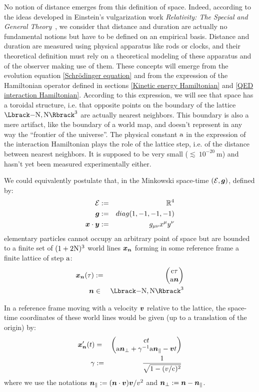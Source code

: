 \documentclass[10pt,a4paper,twoside,openany]{book}
\begin{document}
 No notion of distance emerges from this definition of space. Indeed, according to the ideas developed in Einstein's vulgarization work \textit{Relativity: The Special and General Theory}~\cite{Einstein1916}, we consider that distance and duration are actually no fundamental notions but have to be defined on an empirical basis. Distance and duration are measured using physical apparatus like rods or clocks, and their theoretical definition must rely on a theoretical modeling of these apparatus and of the observer making use of them. These concepts will emerge from the evolution equation \ref{Schrödinger equation} and from the expression of the Hamiltonian operator defined in sections \ref{Kinetic energy Hamiltonian} and \ref{QED interaction Hamiltonian}. According to this expression, we will see that space has a toroidal structure, i.e. that opposite points on the boundary of the lattice $\FL$ are actually nearest neighbors. This boundary is also a mere artifact, like the boundary of a world map, and doesn't represent in any way the ``frontier of the universe''. The physical constant $\mathrm a$ in the expression of the interaction Hamiltonian plays the role of the lattice step, i.e. of the distance between nearest neighbors. It is supposed to be very small ($\lesssim~10^{-20}~\mathrm m$) and hasn't yet been measured experimentally either.

 We could equivalently postulate that, in the Minkowski space-time $(\mathcal E,\boldsymbol{g})$, defined by:
\begin{eqnarray*}
\mathcal E & := & \mathbb{R}^4 \\
\boldsymbol{g} & := & diag(1,-1,-1,-1) \\
\boldsymbol{x} \cdot \boldsymbol{y} & := & {g}_{\mu\nu} {x}^{\mu} {y}^{\nu}
\end{eqnarray*}
elementary particles cannot occupy an arbitrary point of space but are bounded to a finite set of $(1+2 \mathrm N)^3$ world lines $\boldsymbol{x}_{\boldsymbol{n}}$ forming in some reference frame a finite lattice of step $\mathrm a$:
\begin{eqnarray*}
\wlt \n \tau & \eqdef & \matrix{\c \tau \\ \a \n} \\
\n & \in & \FL
\end{eqnarray*}

In a reference frame moving with a velocity $\boldsymbol{v}$ relative to the lattice, the space-time coordinates of these world lines would be given (up to a translation of the origin) by:
\begin{eqnarray*}
{\boldsymbol{x}}'_{\boldsymbol{n}}({t}) & = & \begin{pmatrix} \mathrm c t \\ \mathrm a  \boldsymbol{n}_\perp + \gamma^{-1} \mathrm a  \boldsymbol{n}_\parallel - \boldsymbol{v} t \end{pmatrix} \\
\gamma & := & \frac 1 {\sqrt{1 - (v / \mathrm c)^2}}
\end{eqnarray*}
where we use the notations $\boldsymbol{n}_\parallel := ( \boldsymbol{n} \cdot \boldsymbol{v} ) \boldsymbol{v} / v^2$ and $\boldsymbol{n}_\perp := \boldsymbol{n} - \boldsymbol{n}_\parallel$.
\end{document}
